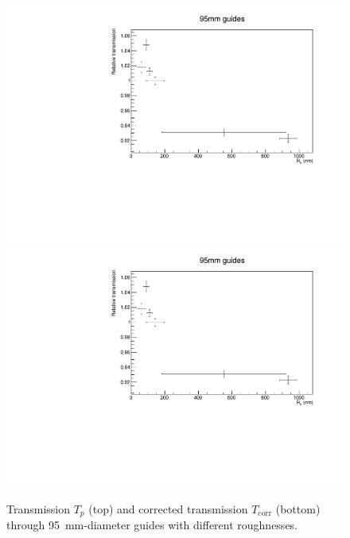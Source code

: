 \documentclass[10pt,letterpaper]{article}
\begin{document}
\begin{figure}
\centering
\includegraphics[width=\textwidth,page=1]{../transmission_with_prestorage/transmission95mm.pdf}
\includegraphics[width=\textwidth,page=2]{../transmission_with_prestorage/transmission95mm.pdf}
\caption{Transmission $T_p$ (top) and corrected transmission $T_\mathrm{corr}$ (bottom) through \SI{95}{\milli\meter}-diameter guides with different roughnesses.}
\label{fig:transmission95}
\end{figure}
\end{document}
